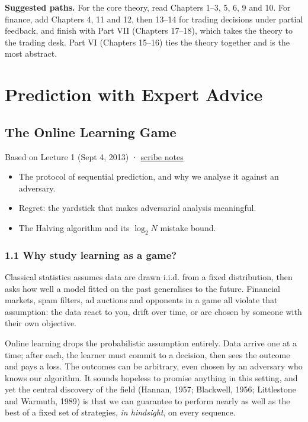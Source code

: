 \documentclass[11pt,a4paper,openany]{book}
\newcommand{\thepartblurb}{}
\newcommand{\chapsource}[1]{{\small\sffamily\color{muted}#1\par}\medskip}
\begin{document}
\textbf{Suggested paths.} For the core theory, read Chapters 1–3, 5, 6, 9 and 10. For finance, add Chapters 4, 11 and 12, then 13–14 for trading decisions under partial feedback, and finish with Part VII (Chapters 17–18), which takes the theory to the trading desk. Part VI (Chapters 15–16) ties the theory together and is the most abstract.

\mainmatter

\def\thepartblurb{How to learn from a crowd of forecasters when nobody promises the future looks like the past.}\part{Prediction with Expert Advice}\label{part1}

\chapter[The online learning game]{The Online Learning Game}\label{ch1}
\chapsource{Based on Lecture 1 (Sept 4, 2013) · \href{https://web.eecs.umich.edu/~jabernet/eecs598course/fall2013/web/notes/lec1_090413.pdf}{scribe notes}}

\begin{goals}
\begin{itemize}
\item The protocol of sequential prediction, and why we analyse it against an adversary.
\item Regret: the yardstick that makes adversarial analysis meaningful.
\item The Halving algorithm and its $\log_2 N$ mistake bound.
\end{itemize}
\end{goals}

\section*{1.1 Why study learning as a game?}\label{ch1-why}

Classical statistics assumes data are drawn i.i.d. from a fixed distribution, then asks how well a model fitted on the past generalises to the future. Financial markets, spam filters, ad auctions and opponents in a game all violate that assumption: the data react to you, drift over time, or are chosen by someone with their own objective.

Online learning drops the probabilistic assumption entirely. Data arrive one at a time; after each, the learner must commit to a decision, then sees the outcome and pays a loss. The outcomes can be arbitrary, even chosen by an adversary who knows our algorithm. It sounds hopeless to promise anything in this setting, and yet the central discovery of the field (Hannan, 1957; Blackwell, 1956; Littlestone and Warmuth, 1989) is that we can guarantee to perform nearly as well as the best of a fixed set of strategies, \emph{in hindsight}, on every sequence.
\end{document}
